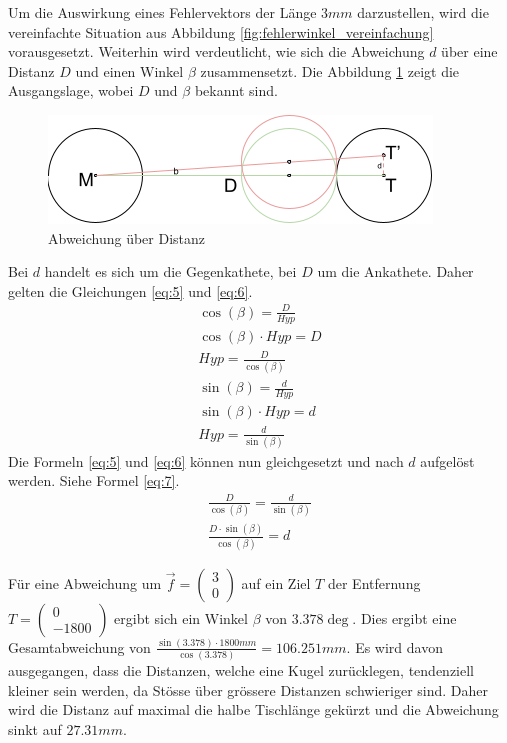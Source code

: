 Um die Auswirkung eines Fehlervektors der Länge $3mm$ darzustellen, wird die vereinfachte Situation aus Abbildung
\ref{fig:fehlerwinkel_vereinfachung} vorausgesetzt. Weiterhin wird verdeutlicht, wie sich die Abweichung $d$ über eine
Distanz $D$ und einen Winkel $\beta$ zusammensetzt. Die Abbildung \ref{fig:abweichung_ueber_distanz} zeigt die Ausgangslage,
wobei $D$ und $\beta$ bekannt sind.
\begin{figure}[h!]
    \begin{center}
        \includegraphics[width=0.4\linewidth]{../common/07_appendix/resources/04_abweichung.png}
    \end{center}
    \caption{Abweichung über Distanz}
    \label{fig:abweichung_ueber_distanz}
\end{figure}
Bei $d$ handelt es sich um die Gegenkathete, bei $D$ um die Ankathete. Daher gelten die Gleichungen \ref{eq:5} und \ref{eq:6}.
\begin{align}
    \cos(\beta) = \frac{D}{Hyp}\\
    \cos(\beta) \cdot Hyp = D\\
    Hyp = \frac{D}{\cos(\beta)}\label{eq:5}\\
    \sin(\beta) = \frac{d}{Hyp}\\
    \sin(\beta) \cdot Hyp = d\\
    Hyp = \frac{d}{\sin(\beta)}\label{eq:6}
\end{align}
Die Formeln \ref{eq:5} und \ref{eq:6} können nun gleichgesetzt und nach $d$ aufgelöst werden. Siehe Formel \ref{eq:7}.
\begin{align}
    \frac{D}{\cos(\beta)} = \frac{d}{\sin(\beta)}\\
    \frac{D \cdot \sin(\beta)}{\cos(\beta)} = d\label{eq:7}
\end{align}

Für eine Abweichung um $\vec{f} = \begin{pmatrix}3\\0\end{pmatrix}$ auf ein Ziel $T$ der Entfernung $T = \begin{pmatrix}0\\-1800\end{pmatrix}$
ergibt sich ein Winkel $\beta$ von $3.378\deg$. Dies ergibt eine Gesamtabweichung von
$\frac{\sin(3.378) \cdot 1800mm}{\cos(3.378)} = 106.251mm$. Es wird davon ausgegangen, dass die Distanzen, welche eine
Kugel zurücklegen, tendenziell kleiner sein werden, da Stösse über grössere Distanzen schwieriger sind. Daher wird die Distanz
auf maximal die halbe Tischlänge gekürzt und die Abweichung sinkt auf $27.31mm$.

